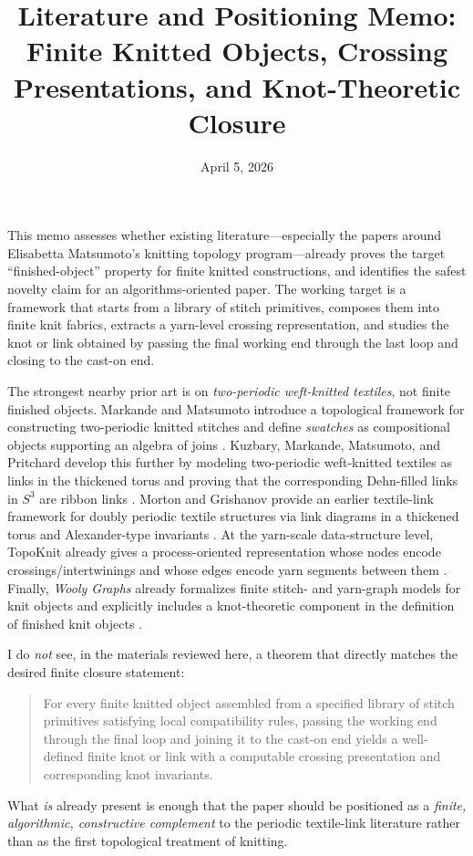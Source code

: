 \documentclass[11pt]{article}
\title{Literature and Positioning Memo:\\Finite Knitted Objects, Crossing Presentations, and Knot-Theoretic Closure}
\author{}
\date{April 5, 2026}
\newcommand{\memoheader}[1]{\vspace{0.4em}{\large\bfseries\color{heading} #1}\par\vspace{0.2em}}
\begin{document}
\maketitle
\thispagestyle{empty}

\memoheader{Purpose}
This memo assesses whether existing literature—especially the papers around Elisabetta Matsumoto's knitting topology program—already proves the target ``finished-object'' property for finite knitted constructions, and identifies the safest novelty claim for an algorithms-oriented paper. The working target is a framework that starts from a library of stitch primitives, composes them into finite knit fabrics, extracts a yarn-level crossing representation, and studies the knot or link obtained by passing the final working end through the last loop and closing to the cast-on end.

\memoheader{Bottom line}
The strongest nearby prior art is on \emph{two-periodic weft-knitted textiles}, not finite finished objects. Markande and Matsumoto introduce a topological framework for constructing two-periodic knitted stitches and define \emph{swatches} as compositional objects supporting an algebra of joins \citep{MarkandeMatsumoto2020}. Kuzbary, Markande, Matsumoto, and Pritchard develop this further by modeling two-periodic weft-knitted textiles as links in the thickened torus and proving that the corresponding Dehn-filled links in $S^3$ are ribbon links \citep{KuzbaryEtAl2025}. Morton and Grishanov provide an earlier textile-link framework for doubly periodic textile structures via link diagrams in a thickened torus and Alexander-type invariants \citep{MortonGrishanov2009}. At the yarn-scale data-structure level, TopoKnit already gives a process-oriented representation whose nodes encode crossings/intertwinings and whose edges encode yarn segments between them \citep{KapllaniEtAl2021}. Finally, \emph{Wooly Graphs} already formalizes finite stitch- and yarn-graph models for knit objects and explicitly includes a knot-theoretic component in the definition of finished knit objects \citep{GrayEtAl2024}.

I do \emph{not} see, in the materials reviewed here, a theorem that directly matches the desired finite closure statement:
\begin{quote}
For every finite knitted object assembled from a specified library of stitch primitives satisfying local compatibility rules, passing the working end through the final loop and joining it to the cast-on end yields a well-defined finite knot or link with a computable crossing presentation and corresponding knot invariants.
\end{quote}
What \emph{is} already present is enough that the paper should be positioned as a \emph{finite, algorithmic, constructive complement} to the periodic textile-link literature rather than as the first topological treatment of knitting.
\end{document}
